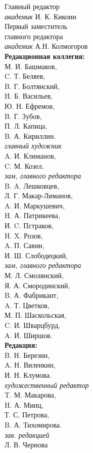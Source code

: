 \documentclass[10pt,a4paper]{article}
\begin{document}
\begin{figure}
\begin{spacing}{0.9}
\noindent Главный редактор\\
\textit{академик} И. К. Кикоин\\
Первый заместитель\\
главного редактора\\
\textit{академик} А.Н. Колмогоров\\
\newline
\textbf{Редакционная коллегия:}\\
М. И. Башмаков,\\
C. Т. Беляев,\\
B. Г. Болтянский,\\
H. Б. Васильев,\\
Ю. Н. Ефремов,\\
B. Г. Зубов,\\
П. Л. Капица,\\
B. А. Кириллин.\\
\textit{главный художник}\\
A. И. Климанов,\\
C. М. Козел.\\
\textit{зам, главного редактора}\\
B. A. Лешковцев,\\
Л. Г. Макар-Лиманов,\\
A. И. Маркушевич,\\
H. А. Патрикеева,\\
И. C. Пстраков,\\
H. X. Розов,\\
A. П. Савин,\\
И. Ш. Слободецкий,\\
\textit{зам, главного редактора}\\
М. Л. Смолянский,\\
Я. А. Смородинский,\\
B. А. Фабрикант,\\
A. Т. Цветков,\\
М. П. Шаскольская,\\
C. И. Шварцбурд,\\
A. И. Ширшов.\\
\newline
\textbf{Редакция:}\\
B. Н. Березин,\\
A. Н. Виленкин,\\
И. Н. Клумова.\\
\textit{художественный редактор}\\
T. М. Макарова,\\
H. А. Минц,\\
Т. С. Петрова,\\
B. А. Тихомирова.\\
\textit{зав. редакцией}\\
Л. В. Чернова\\
\end{spacing}
\end{figure}
\end{document}
